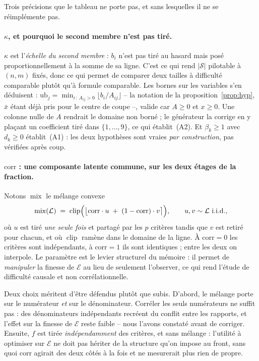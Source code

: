 \documentclass[11pt,a4paper]{article}
\theoremstyle{plain}
\theoremstyle{remark}
\newcommand{\Ecal}{\mathcal{E}}
\newcommand{\Scal}{\mathcal{S}}
\begin{document}
\noindent
Trois précisions que le tableau ne porte pas, et sans lesquelles il ne se
réimplémente pas.

\paragraph{$\kappa$, et pourquoi le second membre n'est pas tiré.}
$\kappa$ est l'\emph{échelle du second membre} : $b_i$ n'est pas tiré au
hasard mais posé proportionnellement à la somme de sa ligne. C'est ce qui
rend $|\Scal|$ pilotable à $(n,m)$ fixés, donc ce qui permet de comparer
deux tailles à difficulté comparable plutôt qu'à formule comparable. Les
bornes sur les variables s'en déduisent :
$\text{ub}_j=\min_{i\,:\,A_{ij}>0}\lfloor b_i/A_{ij}\rfloor$ -- la notation
de la proposition~\ref{prop:hyp}, $\bar x$ étant déjà pris pour le centre
de coupe --, valide car
$A\ge 0$ et $x\ge 0$. Une colonne nulle de $A$ rendrait le domaine non
borné ; le générateur la corrige en y plaçant un coefficient tiré dans
$\{1,\dots,9\}$, ce qui établit~(A2). Et $\beta_k\ge 1$ avec $d_k\ge 0$
établit~(A1) : les deux hypothèses sont vraies \emph{par construction}, pas
vérifiées après coup.

\paragraph{$\text{corr}$ : une composante latente commune, sur les deux
étages de la fraction.} Notons $\operatorname{mix}$ le mélange convexe
\[
  \operatorname{mix}(\mathcal{L})
  \;=\;\operatorname{clip}\Bigl(\bigl\lfloor
    \text{corr}\cdot u \;+\; (1-\text{corr})\cdot v
  \bigr\rceil\Bigr),
  \qquad u,v\sim\mathcal{L}\ \text{i.i.d.},
\]
où $u$ est tiré \emph{une seule fois} et partagé par les $p$ critères tandis
que $v$ est retiré pour chacun, et où $\operatorname{clip}$ ramène dans le
domaine de la ligne. À $\text{corr}=0$ les critères sont indépendants, à
$\text{corr}=1$ ils sont identiques ; entre les deux on interpole. Le
paramètre est le levier structurel du mémoire : il permet de
\emph{manipuler} la finesse de $\Ecal$ au lieu de seulement l'observer, ce
qui rend l'étude de difficulté causale et non corrélationnelle.

Deux choix méritent d'être défendus plutôt que subis. D'abord, le mélange
porte sur le numérateur \emph{et} sur le dénominateur. Corréler les seuls
numérateurs ne suffit pas : des dénominateurs indépendants recréent du
conflit entre les rapports, et l'effet sur la finesse de $\Ecal$ reste
faible -- nous l'avons constaté avant de corriger. Ensuite, $f$ est tirée
\emph{indépendamment} des critères, et sans mélange : l'utilité à optimiser
sur $\Ecal$ ne doit pas hériter de la structure qu'on impose au front, sans
quoi $\text{corr}$ agirait des deux côtés à la fois et ne mesurerait plus
rien de propre.
\end{document}
